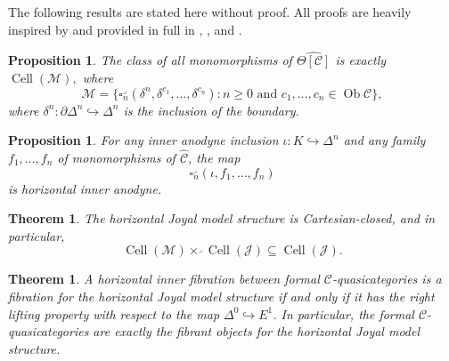 \documentclass[a4paper]{article}
\numberwithin{equation}{subsection}
\theoremstyle{plain}   %
\newtheorem{thm}[equation]{Theorem}
\newtheorem{prop}[equation]{Proposition}
\theoremstyle{definition}
\theoremstyle{remark}
\theoremstyle{plain}
\DeclareMathOperator{\Ob}{Ob}
\newcommand{\psh}[1]{\ensuremath{\widehat{#1}}}
\providecommand{\C}{}
\renewcommand{\C}{\ensuremath{\mathcal{C}}}
\newcommand{\cellset}{\ensuremath{\widehat{\Theta[\mathcal{C}]}}}
\begin{document}
The following results are stated here without proof.  All proofs are heavily inspired by \cite{oury} and provided in full in , , and .

\begin{prop}
	The class of all monomorphisms of \(\cellset\) is exactly \(\operatorname{Cell}(\mathscr{M}),\) where \[\mathscr{M}=\{\square_n^\lrcorner(\delta^n,\delta^{c_1},\dots,\delta^{c_n}) : n\geq 0 \text{ and } c_1,\dots,c_n \in \Ob \C\},\]
	where \(\delta^n:\partial \Delta^n \hookrightarrow \Delta^n\) is the inclusion of the boundary.
\end{prop}

\begin{prop}
	For any inner anodyne inclusion \(\iota:K\hookrightarrow \Delta^n\) and any family \(f_1,\dots,f_n\) of monomorphisms of \(\psh{\C}\), the map \[\square^\lrcorner_n(\iota,f_1,\dots,f_n)\] is horizontal inner anodyne.
\end{prop}

\begin{thm} The horizontal Joyal model structure is Cartesian-closed, and in particular, \[\operatorname{Cell}(\mathscr{M})\times^\lrcorner \operatorname{Cell}(\mathscr{J}) \subseteq \operatorname{Cell}(\mathscr{J}).\]
\end{thm}

\begin{thm}\label{isofibrations}
	A horizontal inner fibration between formal \(\C\)-quasicategories is a fibration for the horizontal Joyal model structure if and only if it has the right lifting property with respect to the map \(\Delta^0\hookrightarrow E^1\).  In particular, the formal \(\C\)-quasicategories are exactly the fibrant objects for the horizontal Joyal model structure.
\end{thm}
\end{document}
